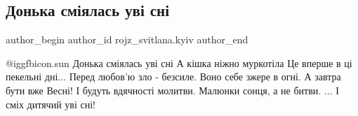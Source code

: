  
 
 
 
 
 
\subsection{Донька сміялась уві сні}
\label{sec:28_02_2022.fb.rojz_svitlana.kyiv.2.donjka_son_smih}
 
\ifcmt
 author_begin
   author_id rojz_svitlana.kyiv
 author_end
\fi

@igg{fbicon.sun} Донька сміялась уві сні
\obeycr
А кішка ніжно муркотіла
Це вперше в ці пекельні дні...
Перед любов'ю зло - безсиле.
Воно себе зжере в огні.
А завтра бути вже Весні!
І будуть вдячності молитви.
Малюнки сонця, а не битви.
... І сміх дитячий уві сні!
\restorecr

